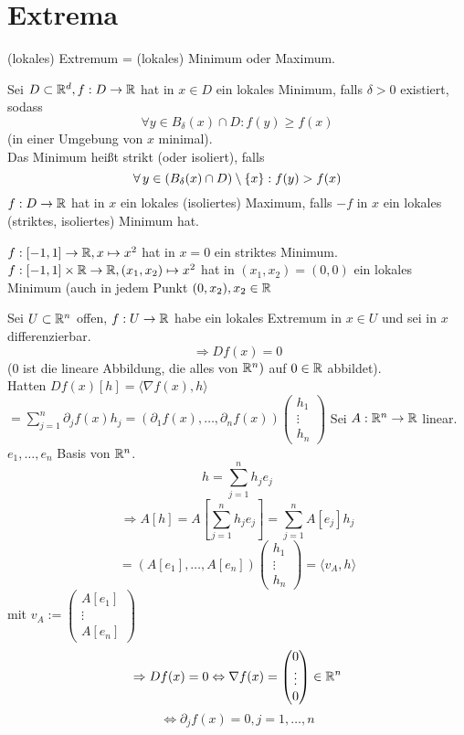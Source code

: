 \documentclass[../ana2.tex]{subfiles}
\begin{document}
\setcounter{section}{13}
\section{Extrema}
(lokales) Extremum = (lokales) Minimum oder Maximum.
\begin{defi}
    Sei \(D \subset \mathbb{R}^d, f:D\rightarrow \mathbb{R}\) hat in \(x \in D\)
    ein lokales Minimum, falls \(\delta > 0\) existiert, sodass
    \[ \forall y \in B_\delta(x) \cap D: f(y) \geq f(x) \]
    (in einer Umgebung von \(x\) minimal). \\
    Das Minimum heißt strikt (oder isoliert), falls 
    \[ \forall y \in (B_\delta(x) \cap D) \setminus \set{x}: f(y) > f(x) \]
    \( f:D\rightarrow \mathbb{R} \) hat in \(x\) ein lokales (isoliertes) Maximum,
    falls \(-f\) in \(x\) ein lokales (striktes, isoliertes) Minimum hat.
\end{defi}
\begin{bsp}
    \(f:[-1, 1]\rightarrow \mathbb{R}, x \mapsto x^2\) hat in \(x = 0\) ein striktes Minimum.\\
    \( f:[-1,1]\times \mathbb{R}\rightarrow \mathbb{R}, (x_1, x_2) \mapsto x^2 \) hat in 
    \((x_1, x_2) = (0,0)\) ein lokales Minimum (auch in jedem Punkt 
    \((0, x_2), x_2 \in \mathbb{R} \)
\end{bsp}
\begin{satz}
    Sei \(U\subset \mathbb{R}^n\) offen, \(f:U\rightarrow \mathbb{R}\) habe ein lokales Extremum
    in \(x \in U\) und sei in \(x\) differenzierbar.
    \[ \Rightarrow Df(x) = 0 \]
    (\(0\) ist die lineare Abbildung, die alles von \(\mathbb{R}^n)\) auf \(0 \in \mathbb{R}\)
    abbildet).\\
    Hatten \(Df(x)[h] = \langle \nabla f(x), h \rangle \)\\
    \( = \sum_{j=1}^n \partial_j f(x) h_j = (\partial_1 f(x), \ldots, \partial_n f(x)) \begin{pmatrix}
        h_1\\
        \vdots\\
        h_n
    \end{pmatrix} \)
    Sei \(A:\mathbb{R}^n\rightarrow \mathbb{R}\) linear. \(e_1, \ldots, e_n\) Basis von \(\mathbb{R}^n\).
    \[ h = \sum_{j = 1}^{n} h_j e_j \]
    \[ \Rightarrow A[h] = A[\sum_{j = 1}^{n} h_j e_j ] = \sum_{j=1}^n A[e_j]h_j \]
    \[ = (A[e_1], \ldots, A[e_n]) \begin{pmatrix}
        h_1\\
        \vdots\\
        h_n
    \end{pmatrix} = \langle v_A, h \rangle \]
    mit \(v_A := \begin{pmatrix}
        A[e_1]\\
        \vdots\\
        A[e_n]
    \end{pmatrix}\)
    \[ \Rightarrow Df(x) = 0 \Leftrightarrow \nabla f(x) = \begin{pmatrix}
        0\\
        \vdots\\
        0
    \end{pmatrix} \in \mathbb{R}^n \]
    \[ \Leftrightarrow \partial_jf(x) = 0, j=1,\ldots,n \]
\end{satz}
\end{document}

